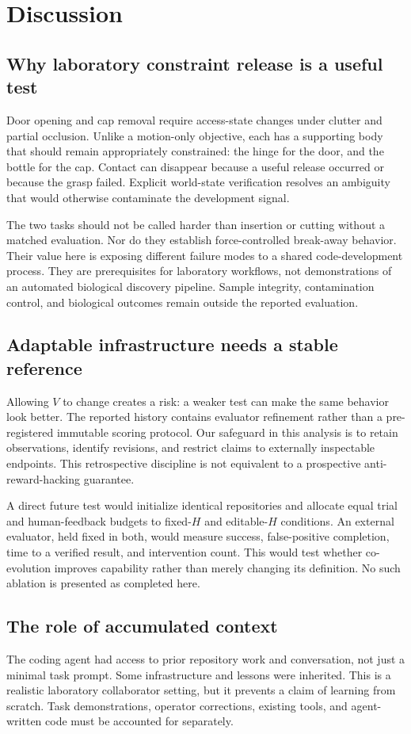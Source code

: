 \section{Discussion}
\subsection{Why laboratory constraint release is a useful test}
Door opening and cap removal require access-state changes under clutter and
partial occlusion. Unlike a motion-only objective, each has a supporting body
that should remain appropriately constrained: the hinge for the door, and the
bottle for the cap. Contact can disappear because a useful release occurred
or because the grasp failed. Explicit world-state verification resolves an
ambiguity that would otherwise contaminate the development signal.

The two tasks should not be called harder than insertion or cutting without
a matched evaluation. Nor do they establish force-controlled break-away
behavior. Their value here is exposing different failure modes to a shared
code-development process. They are prerequisites for laboratory workflows,
not demonstrations of an automated biological discovery pipeline. Sample
integrity, contamination control, and biological outcomes remain outside the
reported evaluation.

\subsection{Adaptable infrastructure needs a stable reference}
Allowing $V$ to change creates a risk: a weaker test can make the same behavior
look better. The reported history contains evaluator refinement rather than a
pre-registered immutable scoring protocol. Our safeguard in this analysis is
to retain observations, identify revisions, and restrict claims to externally
inspectable endpoints. This retrospective discipline is not equivalent to a
prospective anti-reward-hacking guarantee.

A direct future test would initialize identical repositories and allocate
equal trial and human-feedback budgets to fixed-$H$ and editable-$H$
conditions. An external evaluator, held fixed in both, would measure success,
false-positive completion, time to a verified result, and intervention count.
This would test whether co-evolution improves capability rather than merely
changing its definition. No such ablation is presented as completed here.

\subsection{The role of accumulated context}
The coding agent had access to prior repository work and conversation, not
just a minimal task prompt. Some infrastructure and lessons were inherited.
This is a realistic laboratory collaborator setting, but it prevents a claim
of learning from scratch. Task demonstrations, operator corrections, existing
tools, and agent-written code must be accounted for separately.


